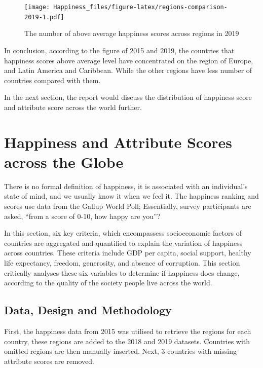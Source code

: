 \documentclass[11pt,a4paper,]{article}
\begin{document}
\begin{figure}
\centering
\texttt{[image: Happiness\_files/figure-latex/regions-comparison-2019-1.pdf]}
\caption{\label{fig:regions-comparison-2019}The number of above average happiness scores across regions in 2019}
\end{figure}

In conclusion, according to the figure of 2015 and 2019, the countries that happiness scores above average level have concentrated on the region of Europe, and Latin America and Caribbean. While the other regions have less number of countries compared with them.

In the next section, the report would discuss the distribution of happiness score and attribute score across the world further.

\clearpage

\hypertarget{happiness-and-attribute-scores-across-the-globe}{%
\section{Happiness and Attribute Scores across the Globe}\label{happiness-and-attribute-scores-across-the-globe}}

There is no formal definition of happiness, it is associated with an individual's state of mind, and we usually know it when we feel it. The happiness ranking and scores use data from the Gallup World Poll; Essentially, survey participants are asked, ``from a score of 0-10, how happy are you''? \autocite{sachs2018world}

In this section, six key criteria, which encompassess socioeconomic factors of countries are aggregated and quantified to explain the variation of happiness across countries. These criteria include GDP per capita, social support, healthy life expectancy, freedom, generosity, and absence of corruption. This section critically analyses these six variables to determine if happiness does change, according to the quality of the society people live across the world.

\clearpage

\hypertarget{data-design-and-methodology}{%
\subsection{Data, Design and Methodology}\label{data-design-and-methodology}}

First, the happiness data from 2015 was utilised to retrieve the regions for each country, these regions are added to the 2018 and 2019 datasets. Countries with omitted regions are then manually inserted. Next, 3 countries with missing attribute scores are removed.
\end{document}
